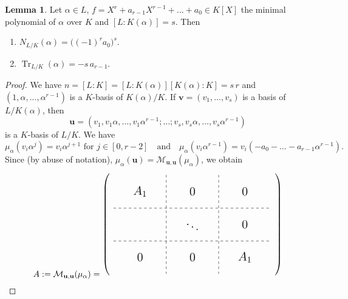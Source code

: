 \documentclass[12pt,a4paper]{report}
\theoremstyle{definition}
\newtheorem{lemma}[theorem]{Lemma}
\theoremstyle{num.custom-title}
\DeclareMathOperator{\Tr}{Tr}
\newcommand{\M}{\mathcal{M}}
\renewcommand{\u}{\mathbf{u}}
\begin{document}
\begin{lemma}\label{lemma-norm-trace_min-poly}
Let $\alpha \in L$, $f= X^r + a_{r-1} X^{r-1} + \ldots + a_0 \in K[X]$ the minimal polynomial of $\alpha$ over $K$ and $[L:K(\alpha)]=s$. Then
\begin{enumerate}
\item $N_{L/K}(\alpha) = \big( (-1)^r a_0 \big)^s$.
\item $\Tr_{L/K}(\alpha) = -s \, a_{r-1}$.
\end{enumerate}
\begin{proof}
We have $n=[L:K]=[L:K(\alpha)][K(\alpha):K]=s \, r$ and $(1,\alpha,...,\alpha^{r-1})$ is a $K$-basis of $K(\alpha)/K$. If $\mathbf{v}=(v_1,...,v_s)$ is a basis of $L/K(\alpha)$, then 
\[
\u = (v_1,v_1 \alpha, \ldots , v_1 \alpha^{r-1}; \ldots ; v_s, v_s \alpha, \ldots ,v_s \alpha^{r-1})
\]
is a $K$-basis of $L/K$. We have
\[
\mu_\alpha (v_i \alpha^j) = v_i \alpha^{j+1} \text{ for } j \in [0,r-2] \quad \text{and} \quad \mu_\alpha (v_i \alpha^{r-1}) = v_i (-a_0 - \ldots - a_{r-1} \alpha^{r-1}).
\]
Since (by abuse of notation), $\mu_\alpha (\u) = \M_{\u,\u}(\mu_\alpha)$, we obtain
\[
A := \M_{\u,\u}(\mu_\alpha) =
\begin{tikzpicture}[
style1/.style={
  matrix of math nodes,
  every node/.append style={text width=#1,align=center,minimum height=3ex},
  nodes in empty cells,
  left delimiter=(,
  right delimiter=),
  }
]
\matrix[style1=0.85cm] (1mat)
{
  & & & & &  \\
  & & & & & \\
  & & & & & \\
  & & & & & \\
  & & & & & \\
  & & & & & \\
  & & & & & \\
  & & & & & \\
  & & & & & \\
};
\draw[dashed]
  (1mat-3-1.south west) -- (1mat-3-6.south east);
\draw[dashed]
  (1mat-6-1.south west) -- (1mat-6-6.south east);
\draw[dashed]
  (1mat-1-4.north east) -- (1mat-9-4.south east);
\draw[dashed]
  (1mat-1-2.north east) -- (1mat-9-2.south east);
\node[font=\Large] 
  at (1mat-2-1.east) {$A_1$};
\node[font=\Large] 
  at (1mat-2-5.east) {$0$};
  \node[font=\Large] 
  at (1mat-5-3.east) {$\ddots$};
\node[font=\Large] 
  at (1mat-5-5.east) {$0$};
\node[font=\Large] 
  at (1mat-8-5.east) {$A_1$};
\node[font=\Large] 
  at (1mat-8-1.east) {$0$};
\node[font=\Large] 
  at (1mat-8-3.east) {$0$};
\node[font=\Large] 
  at (1mat-2-3.east) {$0$};

\end{tikzpicture}\]
\end{proof}
\end{lemma}
\end{document}

